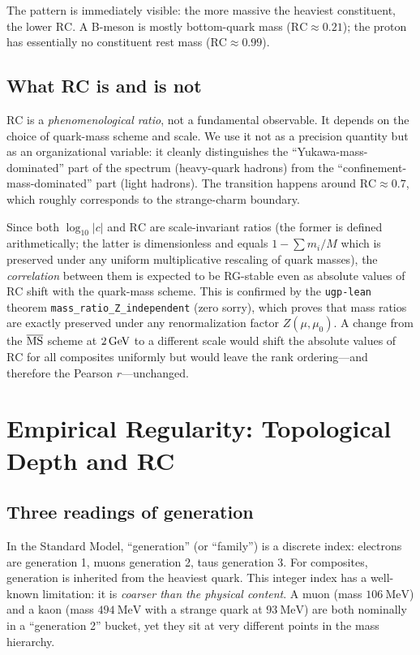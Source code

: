 \documentclass[12pt,a4paper]{article}
\newcommand{\RC}{\ensuremath{\mathrm{RC}}}
\begin{document}
The pattern is immediately visible: the more massive the heaviest constituent,
the lower $\RC$.
A B-meson is mostly bottom-quark mass ($\RC \approx 0.21$); the proton has
essentially no constituent rest mass ($\RC \approx 0.99$).

\subsection{What RC is and is not}

$\RC$ is a \emph{phenomenological ratio}, not a fundamental observable.
It depends on the choice of quark-mass scheme and scale.
We use it not as a precision quantity but as an organizational variable:
it cleanly distinguishes the ``Yukawa-mass-dominated'' part of the spectrum
(heavy-quark hadrons) from the ``confinement-mass-dominated'' part (light
hadrons).
The transition happens around $\RC \approx 0.7$, which roughly corresponds
to the strange-charm boundary.

Since both $\log_{10}|c|$ and $\RC$ are scale-invariant ratios
(the former is defined arithmetically; the latter is dimensionless and equals
$1 - \sum m_i / M$ which is preserved under any uniform multiplicative rescaling
of quark masses), the \emph{correlation} between them is expected to be
RG-stable even as absolute values of $\RC$ shift with the quark-mass scheme.
This is confirmed by the \texttt{ugp-lean} theorem
\texttt{mass\_ratio\_Z\_independent} (zero sorry), which proves that
mass ratios are exactly preserved under any renormalization factor $Z(\mu,\mu_0)$.
A change from the $\overline{\rm MS}$ scheme at $2\,{\rm GeV}$ to a different
scale would shift the absolute values of $\RC$ for all composites uniformly
but would leave the rank ordering---and therefore the Pearson $r$---unchanged.

\section{Empirical Regularity: Topological Depth and RC}
\label{sec:empirical}

\subsection{Three readings of generation}

In the Standard Model, ``generation'' (or ``family'') is a discrete index:
electrons are generation 1, muons generation 2, taus generation 3.
For composites, generation is inherited from the heaviest quark.
This integer index has a well-known limitation: it is
\emph{coarser than the physical content}.
A muon (mass $\SI{106}{\mega\eV}$) and a kaon (mass $\SI{494}{\mega\eV}$
with a strange quark at $\SI{93}{\mega\eV}$) are both nominally in a
``generation 2'' bucket, yet they sit at very different points in the mass
hierarchy.
\end{document}
